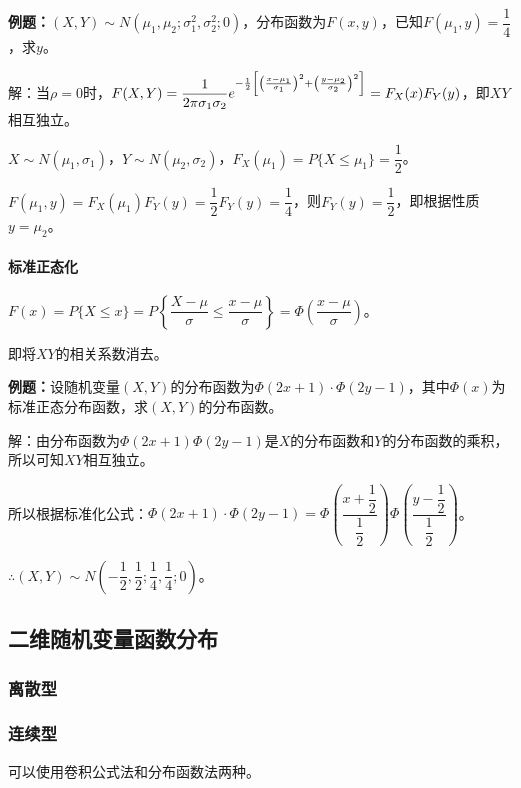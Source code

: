 \documentclass[UTF8, 12pt]{ctexart}
\begin{document}
\textbf{例题：}$(X,Y)\sim N(\mu_1,\mu_2;\sigma_1^2,\sigma_2^2;0)$，分布函数为$F(x,y)$，已知$F(\mu_1,y)=\dfrac{1}{4}$，求$y$。

解：当$\rho=0$时，$F(X,Y)=\dfrac{1}{2\pi\sigma_1\sigma_2}e^{-\frac{1}{2}\left[\left(\frac{x-\mu_1}{\sigma_1}\right)^2+\left(\frac{y-\mu_2}{\sigma_2}\right)^2\right]}\\=F_X(x)F_Y(y)$，即$XY$相互独立。

$X\sim N(\mu_1,\sigma_1)$，$Y\sim N(\mu_2,\sigma_2)$，$F_X(\mu_1)=P\{X\leqslant\mu_1\}=\dfrac{1}{2}$。

$F(\mu_1,y)=F_X(\mu_1)F_Y(y)=\dfrac{1}{2}F_Y(y)=\dfrac{1}{4}$，则$F_Y(y)=\dfrac{1}{2}$，即根据性质$y=\mu_2$。

\paragraph{标准正态化} \leavevmode \medskip

$F(x)=P\{X\leqslant x\}=P\left\{\dfrac{X-\mu}{\sigma}\leqslant\dfrac{x-\mu}{\sigma}\right\}=\varPhi\left(\dfrac{x-\mu}{\sigma}\right)$。

即将$XY$的相关系数消去。

\textbf{例题：}设随机变量$(X,Y)$的分布函数为$\varPhi(2x+1)\cdot\varPhi(2y-1)$，其中$\varPhi(x)$为标准正态分布函数，求$(X,Y)$的分布函数。

解：由分布函数为$\varPhi(2x+1)\varPhi(2y-1)$是$X$的分布函数和$Y$的分布函数的乘积，所以可知$XY$相互独立。

所以根据标准化公式：$\varPhi(2x+1)\cdot\varPhi(2y-1)=\varPhi\left(\dfrac{x+\dfrac{1}{2}}{\dfrac{1}{2}}\right)\varPhi\left(\dfrac{y-\dfrac{1}{2}}{\dfrac{1}{2}}\right)$。

$\therefore(X,Y)\sim N\left(-\dfrac{1}{2},\dfrac{1}{2};\dfrac{1}{4},\dfrac{1}{4};0\right)$。

\subsection{二维随机变量函数分布}

\subsubsection{离散型}

\subsubsection{连续型}

可以使用卷积公式法和分布函数法两种。
\end{document}
